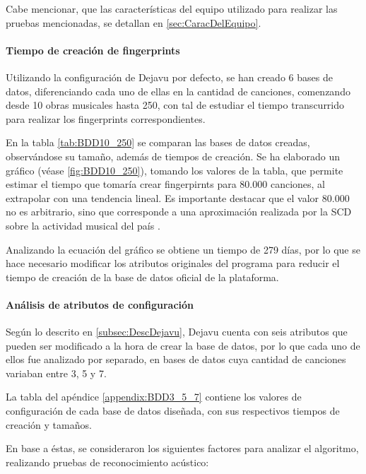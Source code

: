 Cabe mencionar, que las características del equipo utilizado para realizar las pruebas mencionadas, se detallan en \ref{sec:CaracDelEquipo}.

\paragraph{Tiempo de creación de fingerprints}
Utilizando la configuración de Dejavu por defecto, se han creado 6 bases de datos, diferenciando cada uno de ellas en la cantidad de canciones, comenzando desde 10 obras musicales hasta 250, con tal de estudiar el tiempo transcurrido para realizar los fingerprints correspondientes.

En la tabla \ref{tab:BDD10_250} se comparan las bases de datos creadas, observándose su tamaño, además de tiempos de creación. Se ha elaborado un gráfico (véase \ref{fig:BDD10_250}), tomando los valores de la tabla, que permite estimar el tiempo que tomaría crear fingerpirnts para 80.000 canciones, al extrapolar con una tendencia lineal. Es importante destacar que el valor 80.000 no es arbitrario, sino que corresponde a una aproximación realizada por la SCD sobre la actividad musical del país \cite{NumCanciones80k}.

Analizando la ecuación del gráfico se obtiene un tiempo de 279 días, por lo que se hace necesario modificar los atributos originales del programa para reducir el tiempo de creación de la base de datos oficial de la plataforma.

\paragraph{Análisis de atributos de configuración}
Según lo descrito en \ref{subsec:DescDejavu}, Dejavu cuenta con seis atributos que pueden ser modificado a la hora de crear la base de datos, por lo que cada uno de ellos fue analizado por separado, en bases de datos cuya cantidad de canciones variaban entre  3, 5 y 7.

La tabla del apéndice \ref{appendix:BDD3_5_7} contiene los valores de configuración de cada base de datos diseñada, con sus respectivos tiempos de creación y tamaños.

En base a éstas, se consideraron los siguientes factores para analizar el algoritmo, realizando pruebas de reconocimiento acústico:

